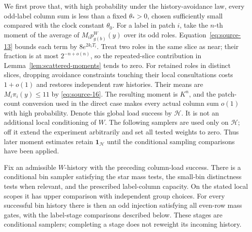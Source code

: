 We first prove that, with high probability under the history-avoidance law, every odd-label column sum is less than a fixed \(\theta_*>0\), chosen sufficiently small compared with the clock constant \(\theta_0\). For a label in patch \(i\), take the \(n\)-th moment of the average of \(M_ip_{g(b)}^W(y)\) over its odd roles. Equation~\eqref{eq:source-13} bounds each term by \(8e^{2k_iT_i}\). Treat two roles in the same slice as near; their fraction is at most \(2^{-n+o(n)}\), so the repeated-slice contribution in Lemma~\ref{lem:scattered-moments} tends to zero. For retained roles in distinct slices, dropping avoidance constraints touching their local consultations costs \(1+o(1)\) and restores independent raw histories. Their means are \(M_i\pi_i(y)\le11\) by \eqref{eq:source-16}. The resulting moment is \(K^n\), and the patch-count conversion used in the direct case makes every actual column sum \(o(1)\) with high probability. Denote this global load success by \(\mathcal H\). It is not an additional local conditioning of \(W\). The following samplers are used only on \(\mathcal H\); off it extend the experiment arbitrarily and set all tested weights to zero. Thus later moment estimates retain \(\mathbf1_{\mathcal H}\) until the conditional sampling comparisons have been applied.

\begin{proposition}\label{prop:high-cluster-sampling}
Fix an admissible \(W\)-history with the preceding column-load success. There is a conditional bin sampler satisfying the star mass tests, the small-bin distinctness tests when relevant, and the prescribed label-column capacity. On the stated local scopes it has upper comparison with independent group choices. For every successful bin history there is then an odd injection satisfying all even-row mass gates, with the label-stage comparisons described below. These stages are conditional samplers; completing a stage does not reweight its incoming history.
\end{proposition}

